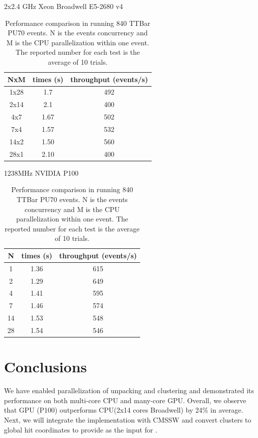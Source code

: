 \documentclass[10pt, paper=a4, UKenglish]{article}
\begin{document}
\begin{table}[!htb]
    \begin{minipage}{.5\linewidth}
      \centering
          \caption*{2x2.4 GHz Xeon Broadwell E5-2680 v4}    
          \begin{tabular}{c|cc}
      \hline
      \hline
      NxM & times (s) & throughput (events/s) \\
      \hline
      1x28 &  1.7 & 492  \\
      2x14 &   2.1 & 400  \\
      4x7 & 1.67 & 502 \\
      7x4 & 1.57 & 532 \\
      14x2 & 1.50 & 560 \\
      28x1 & 2.10 & 400 \\
      \hline
      \hline
    \end{tabular}
        \end{minipage}%
    \begin{minipage}{.5\linewidth}
      \centering
             \caption*{1238MHz NVIDIA P100}    
      \begin{tabular}{c|cc}
      \hline
      \hline
      N &  times (s) & throughput (events/s)  \\
      \hline
      1 & 1.36 & 615 \\
      2 & 1.29 & 649 \\
      4 & 1.41 & 595 \\
      7 & 1.46 & 574 \\
      14 & 1.53 & 548 \\
      28 & 1.54 & 546 \\
      \hline
      \hline
    \end{tabular}
        \end{minipage} 
     \caption{Performance comparison in running 840 TTBar PU70 events. N is the events concurrency and M is the CPU parallelization within one event. The reported number for each test is the average of 10 trials.}
     \label{tab:perf}
     \end{table}

\section{Conclusions}
We have enabled parallelization of unpacking and clustering and demonstrated its performance on both multi-core CPU and many-core GPU. Overall, we observe that GPU (P100) outperforms CPU(2x14 cores Broadwell) by 24\% in average. Next, we will integrate the implementation with CMSSW and convert clusters to global hit coordinates to provide as the input for \mkFit. 
\end{document}
